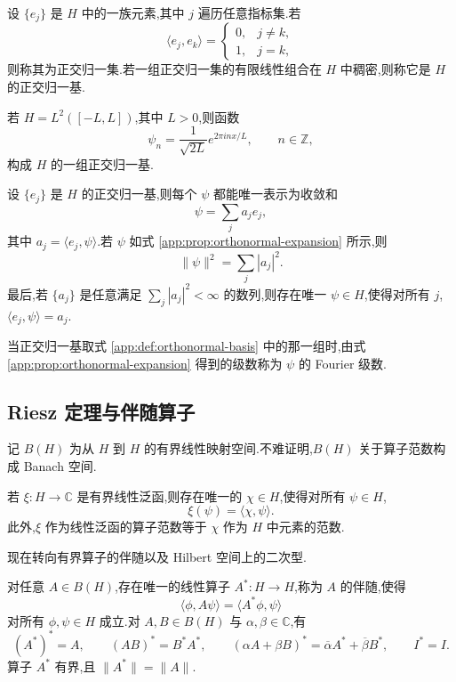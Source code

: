 \begin{definition}[正交归一集与正交归一基]\label{app:def:orthonormal-basis}
设 \(\{e_j\}\) 是 \(H\) 中的一族元素,其中 \(j\) 遍历任意指标集.若
\[
\langle e_j,e_k\rangle=
\begin{cases}0,&j\ne k,\\1,&j=k,\end{cases}
\]
则称其为正交归一集.若一组正交归一集的有限线性组合在 \(H\) 中稠密,则称它是 \(H\) 的正交归一基.
\end{definition}

若 \(H=L^2([-L,L])\),其中 \(L>0\),则函数
\[
\psi_n=\frac1{\sqrt{2L}}e^{2\pi inx/L},\qquad n\in\mathbb Z,\tag{A.11}
\]
构成 \(H\) 的一组正交归一基.

\begin{proposition}[正交归一展开]\label{app:prop:orthonormal-expansion}
设 \(\{e_j\}\) 是 \(H\) 的正交归一基,则每个 \(\psi\) 都能唯一表示为收敛和
\[
\psi=\sum_j a_je_j,\tag{A.12}
\]
其中 \(a_j=\langle e_j,\psi\rangle\).若 \(\psi\) 如式 \ref{app:prop:orthonormal-expansion} 所示,则
\[
\|\psi\|^2=\sum_j|a_j|^2.
\]
最后,若 \(\{a_j\}\) 是任意满足 \(\sum_j|a_j|^2<\infty\) 的数列,则存在唯一 \(\psi\in H\),使得对所有 \(j\),\(\langle e_j,\psi\rangle=a_j\).
\end{proposition}

当正交归一基取式 \ref{app:def:orthonormal-basis} 中的那一组时,由式 \ref{app:prop:orthonormal-expansion} 得到的级数称为 \(\psi\) 的 Fourier 级数.

\subsection{Riesz 定理与伴随算子}

记 \(B(H)\) 为从 \(H\) 到 \(H\) 的有界线性映射空间.不难证明,\(B(H)\) 关于算子范数构成 Banach 空间.

\begin{theorem}\label{app:thm:riesz}
若 \(\xi:H\to\mathbb C\) 是有界线性泛函,则存在唯一的 \(\chi\in H\),使得对所有 \(\psi\in H\),
\[
\xi(\psi)=\langle\chi,\psi\rangle.
\]
此外,\(\xi\) 作为线性泛函的算子范数等于 \(\chi\) 作为 \(H\) 中元素的范数.
\end{theorem}

现在转向有界算子的伴随以及 Hilbert 空间上的二次型.

\begin{proposition}[伴随算子]\label{app:prop:adjoint}
对任意 \(A\in B(H)\),存在唯一的线性算子 \(A^*:H\to H\),称为 \(A\) 的伴随,使得
\[
\langle\phi,A\psi\rangle=\langle A^*\phi,\psi\rangle
\]
对所有 \(\phi,\psi\in H\) 成立.对 \(A,B\in B(H)\) 与 \(\alpha,\beta\in\mathbb C\),有
\[
(A^*)^*=A,\qquad (AB)^*=B^*A^*,\qquad
(\alpha A+\beta B)^*=\overline\alpha A^*+\overline\beta B^*,\qquad I^*=I.
\]
算子 \(A^*\) 有界,且 \(\|A^*\|=\|A\|\).
\end{proposition}


